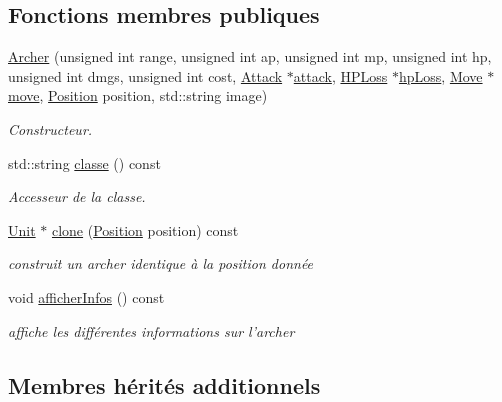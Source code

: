 \subsection*{Fonctions membres publiques}
\begin{DoxyCompactItemize}
\item 
\hypertarget{classArcher_a339791774caa50d6a8d3a5b7a10fb228}{\hyperlink{classArcher_a339791774caa50d6a8d3a5b7a10fb228}{Archer} (unsigned int range, unsigned int ap, unsigned int mp, unsigned int hp, unsigned int dmgs, unsigned int cost, \hyperlink{classAttack}{Attack} $\ast$\hyperlink{classUnit_ac06b8f6e30f851f15a42d8a1d951034a}{attack}, \hyperlink{classHPLoss}{H\+P\+Loss} $\ast$\hyperlink{classUnit_a3090f43e2ee6a08587a160afaa26e7cd}{hp\+Loss}, \hyperlink{classMove}{Move} $\ast$\hyperlink{classUnit_a8c6bfbaf9bf204baec6ba3c11468ec2f}{move}, \hyperlink{classPosition}{Position} position, std\+::string image)}\label{classArcher_a339791774caa50d6a8d3a5b7a10fb228}

\begin{DoxyCompactList}\small\item\em Constructeur. \end{DoxyCompactList}\item 
std\+::string \hyperlink{classArcher_a41ff30d3d1eac71a13bd5b5cc86a2d6b}{classe} () const 
\begin{DoxyCompactList}\small\item\em Accesseur de la classe. \end{DoxyCompactList}\item 
\hyperlink{classUnit}{Unit} $\ast$ \hyperlink{classArcher_a898839f83f972b3e2c000c9dfb92487c}{clone} (\hyperlink{classPosition}{Position} position) const 
\begin{DoxyCompactList}\small\item\em construit un archer identique à la position donnée \end{DoxyCompactList}\item 
\hypertarget{classArcher_a711fbb1d20af0d71b68e35b41507615b}{void \hyperlink{classArcher_a711fbb1d20af0d71b68e35b41507615b}{afficher\+Infos} () const }\label{classArcher_a711fbb1d20af0d71b68e35b41507615b}

\begin{DoxyCompactList}\small\item\em affiche les différentes informations sur l'archer \end{DoxyCompactList}\end{DoxyCompactItemize}
\subsection*{Membres hérités additionnels}


